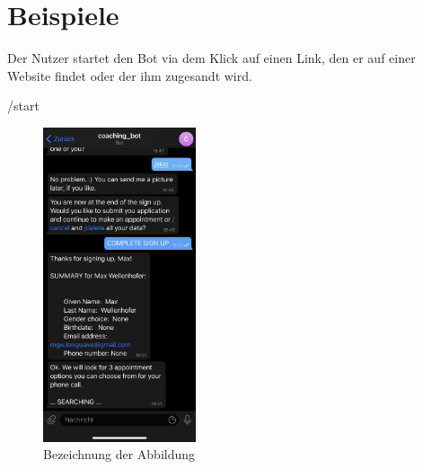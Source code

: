 \label{Beispiele}
\chapter{Beispiele}

Der Nutzer startet den Bot via dem Klick auf einen Link, den er auf einer Website findet oder der ihm zugesandt wird.

/start
\begin{figure}
	\centering
	\includegraphics[width=0.4\textwidth]{images/coaching_bot_dummy_screenshot.jpeg}
	\caption{Bezeichnung der Abbildung}
	\label{fig: Abbildung 1}
\end{figure}


